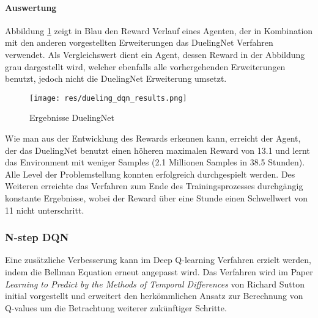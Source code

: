 \documentclass[11pt]{scrartcl}
\begin{document}
\paragraph*{Auswertung}
\noindent
\newline
Abbildung \ref{fig:dueling_dqn_results} zeigt in Blau den Reward Verlauf eines Agenten,
der in Kombination mit den anderen vorgestellten Erweiterungen das DuelingNet Verfahren
verwendet. Als Vergleichswert dient ein Agent, dessen Reward in der Abbildung grau
dargestellt wird, welcher ebenfalls alle vorhergehenden Erweiterungen benutzt, 
jedoch nicht die DuelingNet Erweiterung umsetzt.
\begin{figure}[htp]
  \centering
  \texttt{[image: res/dueling\_dqn\_results.png]}
  \caption{Ergebnisse DuelingNet}
  \label{fig:dueling_dqn_results}
\end{figure}
\noindent
Wie man aus der Entwicklung des Rewards erkennen kann, erreicht der Agent, der das
DuelingNet benutzt einen höheren maximalen Reward von 13.1 und lernt das Environment mit
weniger Samples (2.1 Millionen Samples in 38.5 Stunden). Alle Level der Problemstellung
konnten erfolgreich durchgespielt werden. Des Weiteren erreichte das Verfahren zum Ende
des Trainingsprozesses durchgängig konstante Ergebnisse, wobei der Reward über eine Stunde
einen Schwellwert von 11 nicht unterschritt.

\subsubsection{N-step DQN}
Eine zusätzliche Verbesserung kann im Deep Q-learning Verfahren erzielt werden, indem die
Bellman Equation erneut angepasst wird. Das Verfahren wird im Paper \textit{Learning to
Predict by the Methods of Temporal Differences} von Richard Sutton\cite{S1988} initial
vorgestellt und erweitert den herkömmlichen Ansatz zur Berechnung von Q-values um die
Betrachtung weiterer zukünftiger Schritte. 
\end{document}
